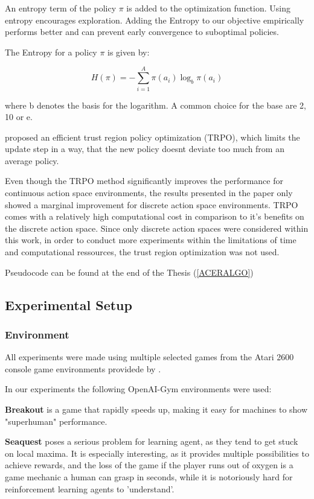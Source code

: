An entropy term of the policy $\pi$ is added to the optimization function.
Using entropy encourages exploration. Adding the Entropy to our objective empirically performs better and can prevent early convergence to suboptimal policies.

The Entropy for a policy $\pi$ is given by:

\begin{equation}
H(\pi) = -\sum^A_{i=1} \pi(a_i)\log_b \pi(a_i)
\end{equation}

where b denotes the basis for the logarithm. A common choice for the  base are 2, 10 or e. \citep{entropy}

\citet{ACER} proposed an efficient trust region policy optimization (TRPO), which limits the update step in a way, that the new policy doesnt deviate too much from an average policy. 

Even though the TRPO method significantly improves the performance for continuous action space environments, the results presented in the paper only showed a marginal improvement for discrete action space environments.
TRPO comes with a relatively high computational cost in comparison to it's benefits on the discrete action space.
Since only discrete action spaces were considered within this work, in order to conduct more experiments within the limitations of time and computational ressources, the trust region optimization was not used.

Pseudocode can be found at the end of the Thesis (\ref{ACERALGO})

\subsection{Experimental Setup}

\subsubsection{Environment}
All experiments were made using multiple selected games from the Atari 2600 console game environments providede by \citet{openaigym}.

In our experiments the following OpenAI-Gym environments were used:

\textbf{Breakout} is a game that rapidly speeds up, making it easy for machines to show "superhuman" performance.

\textbf{Seaquest} poses a serious problem for learning agent, as they tend to get stuck on local maxima. It is especially interesting, as it provides multiple possibilities to achieve rewards, and the loss of the game if the player runs out of oxygen is a game mechanic a human can grasp in seconds, while it is notoriously hard for reinforcement learning agents to 'understand'.

